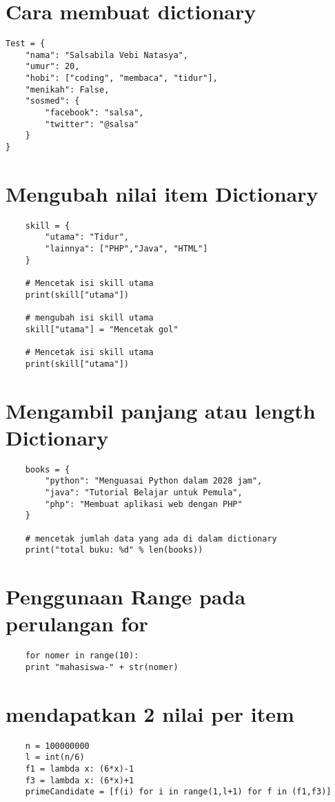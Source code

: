 \documentclass[12pt]{article} %
\begin{document}
\section{Cara membuat dictionary}
\begin{lstlisting}
Test = {
	"nama": "Salsabila Vebi Natasya",
	"umur": 20,
	"hobi": ["coding", "membaca", "tidur"],
	"menikah": False,
	"sosmed": {
		"facebook": "salsa",
		"twitter": "@salsa"
	} 
}
\end{lstlisting}

\section{Mengubah nilai item Dictionary}
\begin{lstlisting}
	skill = {
		"utama": "Tidur",
		"lainnya": ["PHP","Java", "HTML"]
	}
	
	# Mencetak isi skill utama
	print(skill["utama"])
	
	# mengubah isi skill utama
	skill["utama"] = "Mencetak gol"
	
	# Mencetak isi skill utama
	print(skill["utama"])
\end{lstlisting}

\section{Mengambil panjang atau length Dictionary}
\begin{lstlisting}
	books = {
		"python": "Menguasai Python dalam 2028 jam",
		"java": "Tutorial Belajar untuk Pemula",
		"php": "Membuat aplikasi web dengan PHP"
	}
	
	# mencetak jumlah data yang ada di dalam dictionary
	print("total buku: %d" % len(books))
\end{lstlisting}

\section{Penggunaan Range pada perulangan for}
\begin{lstlisting}
	for nomer in range(10):
	print "mahasiswa-" + str(nomer)
\end{lstlisting}


\section{mendapatkan 2 nilai per item }
\begin{lstlisting}
	n = 100000000
	l = int(n/6)
	f1 = lambda x: (6*x)-1
	f3 = lambda x: (6*x)+1
	primeCandidate = [f(i) for i in range(1,l+1) for f in (f1,f3)]
\end{lstlisting}
\end{document}
